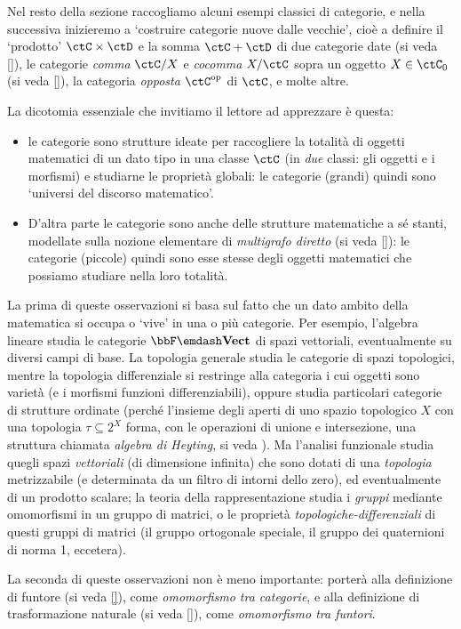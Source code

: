 Nel resto della sezione raccogliamo alcuni esempi classici di categorie, e nella successiva inizieremo a `costruire categorie nuove dalle vecchie', cioè a definire il `prodotto' $\ctC\times\ctD$ e la somma $\ctC+\ctD$ di due categorie date (si veda \autoref{}), le categorie \emph{comma} $\ctC/X$ e \emph{cocomma} $X/\ctC$ sopra un oggetto $X\in\ctC_0$ (si veda \autoref{}), la categoria \emph{opposta} $\ctC^\op$ di $\ctC$, e molte altre.

La dicotomia essenziale che invitiamo il lettore ad apprezzare è questa:
\begin{itemize}
    \item le categorie sono strutture ideate per raccogliere la totalità di oggetti matematici di un dato tipo in una classe $\ctC$ (in \emph{due} classi: gli oggetti e i morfismi) e studiarne le proprietà globali: le categorie (grandi) quindi sono `universi del discorso matematico'.
    \item D'altra parte le categorie sono anche delle strutture matematiche a sé stanti, modellate sulla nozione elementare di \emph{multigrafo diretto} (si veda \autoref{}): le categorie (piccole) quindi sono esse stesse degli oggetti matematici che possiamo studiare nella loro totalità.
\end{itemize}
La prima di queste osservazioni si basa sul fatto che un dato ambito della matematica si occupa o `vive' in una o più categorie. Per esempio, l'algebra lineare studia le categorie $\bbF\emdash\ctVect$ di spazi vettoriali, eventualmente su diversi campi di base. La topologia generale studia le categorie di spazi topologici, mentre la topologia differenziale si restringe alla categoria i cui oggetti sono varietà (e i morfismi funzioni differenziabili), oppure studia particolari categorie di strutture ordinate (perché l'insieme degli aperti di uno spazio topologico $X$ con una topologia $\tau \subseteq 2^X$ forma, con le operazioni di unione e intersezione, una struttura chiamata \emph{algebra di Heyting}, si veda \cite{}). Ma l'analisi funzionale studia quegli spazi \emph{vettoriali} (di dimensione infinita) che sono dotati di una \emph{topologia} metrizzabile (e determinata da un filtro di intorni dello zero), ed eventualmente di un prodotto scalare; la teoria della rappresentazione studia i \emph{gruppi} mediante omomorfismi in un gruppo di matrici, o le proprietà \emph{topologiche-differenziali} di questi gruppi di matrici (il gruppo ortogonale speciale, il gruppo dei quaternioni di norma 1, eccetera).

La seconda di queste osservazioni non è meno importante: porterà alla definizione di funtore (si veda \autoref{}), come \emph{omomorfismo tra categorie}, e alla definizione di trasformazione naturale (si veda \autoref{}), come \emph{omomorfismo tra funtori}.

